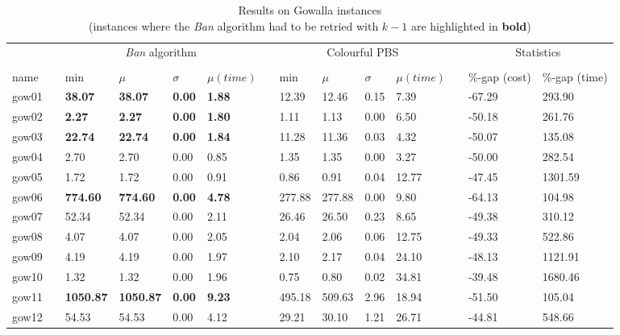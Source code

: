 \begin{table}[H]
    \caption{Results on Gowalla instances\\\scriptsize{(instances where the \emph{Ban} algorithm had to be retried with $k-1$ are highlighted in \textbf{bold})}}\label{table:gowalla_cost}
    \tiny
    \begin{tabularx}{\textwidth}{llXXXXlXXXXlXX}
    \firsthline
    \multicolumn{1}{c}{Instance}& \quad & \multicolumn{4}{c}{\emph{Ban} algorithm}& \quad & \multicolumn{4}{c}{Colourful PBS} & \quad & \multicolumn{2}{c}{Statistics}\\
    \cline{1-1} \cline{3-6} \cline{8-11} \cline{13-14}\\
    name && min & $\mu$ & $\sigma$ & $\mu (time)$ && min & $\mu$ & $\sigma$ & $\mu (time)$ && \%-gap (cost) & \%-gap (time)\\
    \hline
    gow01 && \textbf{38.07} & \textbf{38.07} & \textbf{0.00} & \textbf{1.88} && 12.39 & 12.46 & 0.15 & 7.39 && -67.29 & 293.90\\
    gow02 && \textbf{2.27} & \textbf{2.27} & \textbf{0.00} & \textbf{1.80} && 1.11 & 1.13 & 0.00 & 6.50 && -50.18 & 261.76\\
    gow03 && \textbf{22.74} & \textbf{22.74} & \textbf{0.00} & \textbf{1.84} && 11.28 & 11.36 & 0.03 & 4.32 && -50.07 & 135.08\\
    gow04 && 2.70 & 2.70 & 0.00 & 0.85 && 1.35 & 1.35 & 0.00 & 3.27 && -50.00 & 282.54\\
    gow05 && 1.72 & 1.72 & 0.00 & 0.91 && 0.86 & 0.91 & 0.04 & 12.77 && -47.45 & 1301.59\\
    gow06 && \textbf{774.60} & \textbf{774.60} & \textbf{0.00} & \textbf{4.78} && 277.88 & 277.88 & 0.00 & 9.80 && -64.13 & 104.98\\
    gow07 && 52.34 & 52.34 & 0.00 & 2.11 && 26.46 & 26.50 & 0.23 & 8.65 && -49.38 & 310.12\\
    gow08 && 4.07 & 4.07 & 0.00 & 2.05 && 2.04 & 2.06 & 0.06 & 12.75 && -49.33 & 522.86\\
    gow09 && 4.19 & 4.19 & 0.00 & 1.97 && 2.10 & 2.17 & 0.04 & 24.10 && -48.13 & 1121.91\\
    gow10 && 1.32 & 1.32 & 0.00 & 1.96 && 0.75 & 0.80 & 0.02 & 34.81 && -39.48 & 1680.46\\
    gow11 && \textbf{1050.87} & \textbf{1050.87} & \textbf{0.00} & \textbf{9.23} && 495.18 & 509.63 & 2.96 & 18.94 && -51.50 & 105.04\\
    gow12 && 54.53 & 54.53 & 0.00 & 4.12 && 29.21 & 30.10 & 1.21 & 26.71 && -44.81 & 548.66\\

\end{tabularx}
\end{table}
